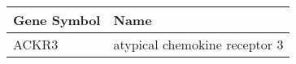 \begin{tabular}{ll}
\toprule
Gene Symbol &                          Name \\
\midrule
      ACKR3 & atypical chemokine receptor 3 \\
\bottomrule
\end{tabular}
